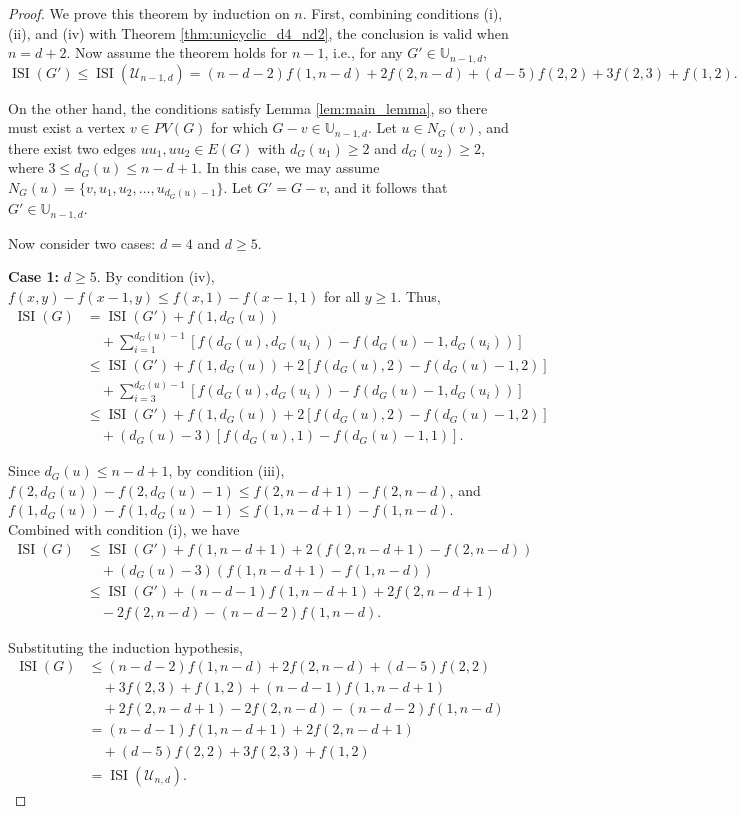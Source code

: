 \documentclass[10pt,a4paper]{amsart}
\newcommand{\ISI}{\operatorname{ISI}}
\newcommand{\UU}{\mathbb{U}}
\begin{document}
\begin{proof}
We prove this theorem by induction on \(n\). First, combining conditions (i), (ii), and (iv) with Theorem \ref{thm:unicyclic_d4_nd2}, the conclusion is valid when \(n = d+2\). Now assume the theorem holds for \(n-1\), i.e., for any \(G' \in \UU_{n-1,d}\),
\[
\ISI(G') \leq \ISI(\mathcal{U}_{n-1,d}) = (n-d-2)f(1,n-d) + 2f(2,n-d) + (d-5)f(2,2) + 3f(2,3) + f(1,2).
\]

On the other hand, the conditions satisfy Lemma \ref{lem:main_lemma}, so there must exist a vertex \(v \in PV(G)\) for which \(G - v \in \UU_{n-1,d}\). Let \(u \in N_G(v)\), and there exist two edges \(uu_1, uu_2 \in E(G)\) with \(d_G(u_1) \geq 2\) and \(d_G(u_2) \geq 2\), where \(3 \leq d_G(u) \leq n-d+1\). In this case, we may assume \(N_G(u) = \{v, u_1, u_2, \ldots, u_{d_G(u)-1}\}\). Let \(G' = G - v\), and it follows that \(G' \in \UU_{n-1,d}\).

Now consider two cases: \(d = 4\) and \(d \geq 5\).

\textbf{Case 1:} \(d \geq 5\). By condition (iv), \(f(x,y) - f(x-1,y) \leq f(x,1) - f(x-1,1)\) for all \(y \geq 1\). Thus,
\begin{align*}
\ISI(G) &= \ISI(G') + f(1,d_G(u)) \\
&\quad + \sum_{i=1}^{d_G(u)-1} [f(d_G(u), d_G(u_i)) - f(d_G(u)-1, d_G(u_i))] \\[4pt]
&\leq \ISI(G') + f(1,d_G(u)) + 2[f(d_G(u),2) - f(d_G(u)-1,2)] \\
&\quad + \sum_{i=3}^{d_G(u)-1} [f(d_G(u), d_G(u_i)) - f(d_G(u)-1, d_G(u_i))] \\[4pt]
&\leq \ISI(G') + f(1,d_G(u)) + 2[f(d_G(u),2) - f(d_G(u)-1,2)] \\
&\quad + (d_G(u)-3)[f(d_G(u),1) - f(d_G(u)-1,1)].
\end{align*}

Since \(d_G(u) \leq n-d+1\), by condition (iii), \(f(2,d_G(u)) - f(2,d_G(u)-1) \leq f(2,n-d+1) - f(2,n-d)\), and \(f(1,d_G(u)) - f(1,d_G(u)-1) \leq f(1,n-d+1) - f(1,n-d)\). Combined with condition (i), we have
\begin{align*}
\ISI(G) &\leq \ISI(G') + f(1,n-d+1) + 2(f(2,n-d+1) - f(2,n-d)) \\
&\quad + (d_G(u)-3)(f(1,n-d+1) - f(1,n-d)) \\[4pt]
&\leq \ISI(G') + (n-d-1)f(1,n-d+1) + 2f(2,n-d+1) \\
&\quad - 2f(2,n-d) - (n-d-2)f(1,n-d).
\end{align*}

Substituting the induction hypothesis,
\begin{align*}
\ISI(G) &\leq (n-d-2)f(1,n-d) + 2f(2,n-d) + (d-5)f(2,2) \\
&\quad + 3f(2,3) + f(1,2) + (n-d-1)f(1,n-d+1) \\
&\quad + 2f(2,n-d+1) - 2f(2,n-d) - (n-d-2)f(1,n-d) \\[4pt]
&= (n-d-1)f(1,n-d+1) + 2f(2,n-d+1) \\
&\quad + (d-5)f(2,2) + 3f(2,3) + f(1,2) \\[4pt]
&= \ISI(\mathcal{U}_{n,d}).
\end{align*}


\end{proof}
\end{document}

